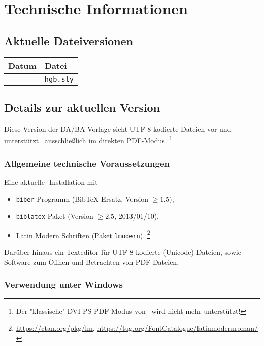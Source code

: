 \chapter{Technische Informationen}
\label{app:TechnischeInfos}

\newcommand*{\checkbox}{{\fboxsep 1pt%
\framebox[1.30\height]{\vphantom{M}\checkmark}}}

\section{Aktuelle Dateiversionen}

\begin{center}
	\begin{tabular}{@{}ll@{}}
		\toprule
		Datum    & Datei            \\
		\midrule
		\hgbDate & \texttt{hgb.sty} \\
		\bottomrule
	\end{tabular}
\end{center}


\section{Details zur aktuellen Version}


Diese Version der DA/BA-Vorlage sieht \mbox{UTF-8} kodierte Dateien vor und
unterstützt \latex\ ausschließlich im direkten PDF-Modus.%
\footnote{Der "klassische" DVI-PS-PDF-Modus von \latex\ wird nicht mehr
unterstützt!}

\subsection{Allgemeine technische Voraussetzungen}

Eine aktuelle \latex-Installation mit
%
\begin{itemize}
		\item \texttt{biber}-Programm (BibTeX-Ersatz, Version $\geq 1.5$),
		\item \texttt{biblatex}-Paket (Version $\geq 2.5$, 2013/01/10),
		\item Latin Modern Schriften (Paket \texttt{lmodern}).%
			\footnote{\url{https://ctan.org/pkg/lm},
				\url{https://tug.org/FontCatalogue/latinmodernroman/}}
\end{itemize}
%
Darüber hinaus ein Texteditor für \mbox{UTF-8} kodierte (Unicode) Dateien,
sowie Software zum Öffnen und Betrachten von PDF-Dateien.


\subsection{Verwendung unter Windows}
\label{sec:VerwendungUnterWindows}

